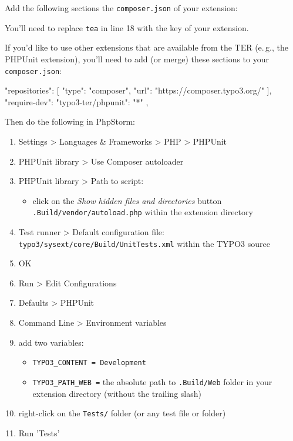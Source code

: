 \documentclass[a4paper,10pt,headsepline]{scrartcl}
\begin{document}
Add the following sections the \texttt{composer.json} of your extension:

\small
{}
\normalsize

You'll need to replace \texttt{tea} in line 18 with the key of your extension.

If you'd like to use other extensions that are available from the TER (e.\,g., the PHPUnit extension), you'll need to add (or merge) these sections to your \texttt{composer.json}:

\begin{jsoncode}
"repositories": [
{
  "type": "composer",
  "url": "https://composer.typo3.org/"
}
],
"require-dev": {
  "typo3-ter/phpunit": "*"
},
\end{jsoncode}

Then do the following in PhpStorm:
\begin{enumerate}
  \item Settings > Languages \& Frameworks > PHP > PHPUnit
  \item PHPUnit library > Use Composer autoloader
  \item PHPUnit library > Path to script:
    \begin{itemize}
      \item click on the \emph{Show hidden files and directories} button
      \texttt{.Build/vendor/autoload.php} within the extension directory
    \end{itemize}
  \item Test runner > Default configuration file: \texttt{typo3/sysext/core/Build/UnitTests.xml} within the TYPO3 source
  \item OK
  \item Run > Edit Configurations
  \item Defaults > PHPUnit
  \item Command Line > Environment variables
  \item add two variables:
    \begin{itemize}
      \item \texttt{TYPO3\_CONTENT = Development}
      \item \texttt{TYPO3\_PATH\_WEB =} the absolute path to \texttt{.Build/Web} folder in your extension directory (without the trailing slash)
    \end{itemize}
  \item right-click on the \texttt{Tests/} folder (or any test file or folder)
  \item Run 'Tests'
\end{enumerate}
\end{document}
